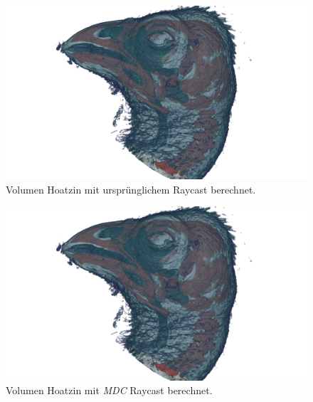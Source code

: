 \begin{landscape}
	\begin{figure}
		\centering
		\includegraphics[width=1\textheight]{../../Grafiken/results/picture_quality/hoatzin/Standard_img-1_Ray-1-5.png}
		\caption{Volumen Hoatzin mit ursprünglichem Raycast berechnet.}
		\label{fig::res::hoa_st}
	\end{figure}
\end{landscape}

\begin{landscape}
	\begin{figure}
		\centering
		\includegraphics[width=1\textheight]{../../Grafiken/results/picture_quality/hoatzin/MDC_img-0-96_ray-1-5.png}
		\caption{Volumen Hoatzin mit \emph{MDC} Raycast berechnet.}
		\label{fig::res::hoa_mdc}
	\end{figure}
\end{landscape}

